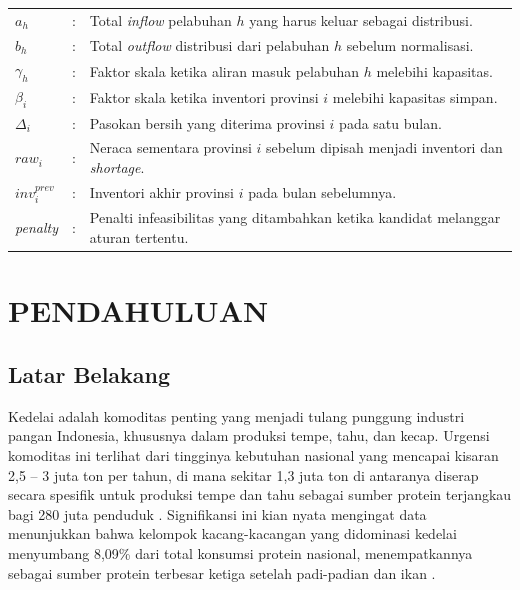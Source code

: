 \documentclass{file/TA-ITS}
\theoremstyle{definition}
\theoremstyle{definition}
\theoremstyle{plain}
\begin{document}
\begin{flushleft}
\begin{longtable}{@{}p{}p{}p{}@{}}
$a_h$ &:& Total \textit{inflow} pelabuhan $h$ yang harus keluar sebagai distribusi. \\
$b_h$ &:& Total \textit{outflow} distribusi dari pelabuhan $h$ sebelum normalisasi. \\
$\gamma_h$ &:& Faktor skala ketika aliran masuk pelabuhan $h$ melebihi kapasitas. \\
$\beta_i$ &:& Faktor skala ketika inventori provinsi $i$ melebihi kapasitas simpan. \\
$\Delta_i$ &:& Pasokan bersih yang diterima provinsi $i$ pada satu bulan. \\
$raw_i$ &:& Neraca sementara provinsi $i$ sebelum dipisah menjadi inventori dan \textit{shortage}. \\
$inv^{prev}_i$ &:& Inventori akhir provinsi $i$ pada bulan sebelumnya. \\
\textit{penalty} &:& Penalti infeasibilitas yang ditambahkan ketika kandidat melanggar aturan tertentu. \\

\end{longtable}
\end{flushleft}

\BagianInti

\chapter{PENDAHULUAN}
\section{Latar Belakang}
Kedelai adalah komoditas penting yang menjadi tulang punggung industri pangan Indonesia, khususnya dalam produksi tempe, tahu, dan kecap. Urgensi komoditas ini terlihat dari tingginya kebutuhan nasional yang mencapai kisaran 2,5 – 3 juta ton per tahun, di mana sekitar 1,3 juta ton di antaranya diserap secara spesifik untuk produksi tempe dan tahu \cite{gakoptindo2022_kedelai,bps_kedelai_placeholder} sebagai sumber protein terjangkau bagi 280 juta penduduk \cite{kemendagri2024_penduduk}. Signifikansi ini kian nyata mengingat data menunjukkan bahwa kelompok kacang-kacangan yang didominasi kedelai menyumbang 8,09\% dari total konsumsi protein nasional, menempatkannya sebagai sumber protein terbesar ketiga setelah padi-padian dan ikan \cite{pusdatin2024konsumsi}.
\end{document}
